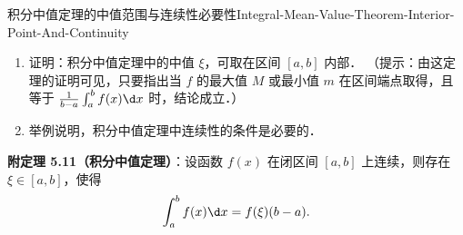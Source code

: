 \begin{problem}{积分中值定理的中值范围与连续性必要性}{Integral-Mean-Value-Theorem-Interior-Point-And-Continuity}
    \begin{enumerate}
        \item 证明：积分中值定理中的中值 $\xi$，可取在区间 $[a, b]$ 内部．
              （提示：由这定理的证明可见，只要指出当 $f$ 的最大值 $M$ 或最小值 $m$ 在区间端点取得，且等于 $\frac{1}{b-a}\int_a^b f(x)\d x$ 时，结论成立．）
        \item 举例说明，积分中值定理中连续性的条件是必要的．
    \end{enumerate}

    \textbf{附定理 5.11（积分中值定理）}：设函数 $f(x)$ 在闭区间 $[a, b]$ 上连续，则存在 $\xi \in [a, b]$，使得
    \begin{equation}
        \int_a^b f(x)\d x = f(\xi)(b-a).
    \end{equation}
\end{problem}

